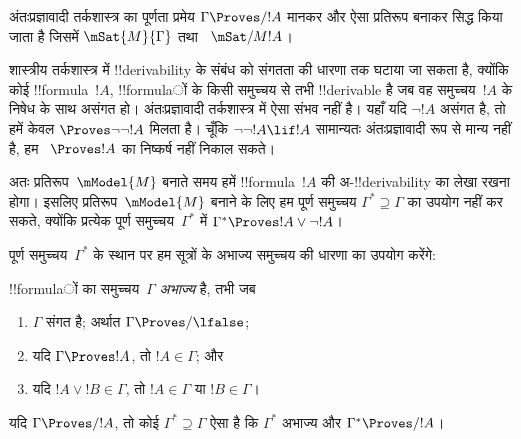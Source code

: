 \documentclass[../../../include/open-logic-section]{subfiles}
\begin{document}


अंतःप्रज्ञावादी तर्कशास्त्र का पूर्णता प्रमेय $\Gamma \Proves/ !A$ मानकर
और ऐसा प्रतिरूप बनाकर सिद्ध किया जाता है जिसमें $\mSat{M}{\Gamma}$ तथा
~$\mSat/{M}{!A}$।

शास्त्रीय तर्कशास्त्र में !!{derivability} के संबंध को संगतता की धारणा तक
घटाया जा सकता है, क्योंकि कोई !!{formula}~$!A$, !!{formula}ों के किसी समुच्चय
से तभी !!{derivable} है जब वह समुच्चय~$!A$ के निषेध के साथ असंगत हो।
अंतःप्रज्ञावादी तर्कशास्त्र में ऐसा संभव नहीं है। यहाँ यदि $\lnot!A$ असंगत
है, तो हमें केवल $\Proves \lnot\lnot !A$ मिलता है। चूँकि
$\lnot\lnot!A \lif !A$ सामान्यतः अंतःप्रज्ञावादी रूप से मान्य नहीं है, हम
~$\Proves !A$ का निष्कर्ष नहीं निकाल सकते।

अतः प्रतिरूप~$\mModel{M}$ बनाते समय हमें !!{formula}~$!A$ की
अ-!!{derivability} का लेखा रखना होगा। इसलिए प्रतिरूप~$\mModel{M}$ बनाने के
लिए हम पूर्ण समुच्चय $\Gamma^* \supseteq \Gamma$ का उपयोग नहीं कर सकते,
क्योंकि प्रत्येक पूर्ण समुच्चय~$\Gamma^*$ में
$\Gamma^* \Proves !A \lor \lnot !A$।

पूर्ण समुच्चय~$\Gamma^*$ के स्थान पर हम सूत्रों के अभाज्य समुच्चय की धारणा
का उपयोग करेंगे:

\begin{defn}
  !!{formula}ों का समुच्चय~$\Gamma$ \emph{अभाज्य} है, तभी जब
  \begin{enumerate}
  \item{} $\Gamma$ संगत है; अर्थात
    $\Gamma \Proves/ \lfalse$;
  \item{} यदि $\Gamma \Proves !A$, तो
    $!A \in \Gamma$; और
  \item{} यदि $!A \lor !B \in \Gamma$, तो
    $!A \in \Gamma$ या $!B \in \Gamma$।
  \end{enumerate}
\end{defn}

\begin{lem}[लिंडेनबाउम का लेम्मा]
   यदि $\Gamma \Proves/ !A$, तो कोई
  $\Gamma^* \supseteq \Gamma$ ऐसा है कि $\Gamma^*$ अभाज्य और
  $\Gamma^* \Proves/ !A$।
\end{lem}
\end{document}
